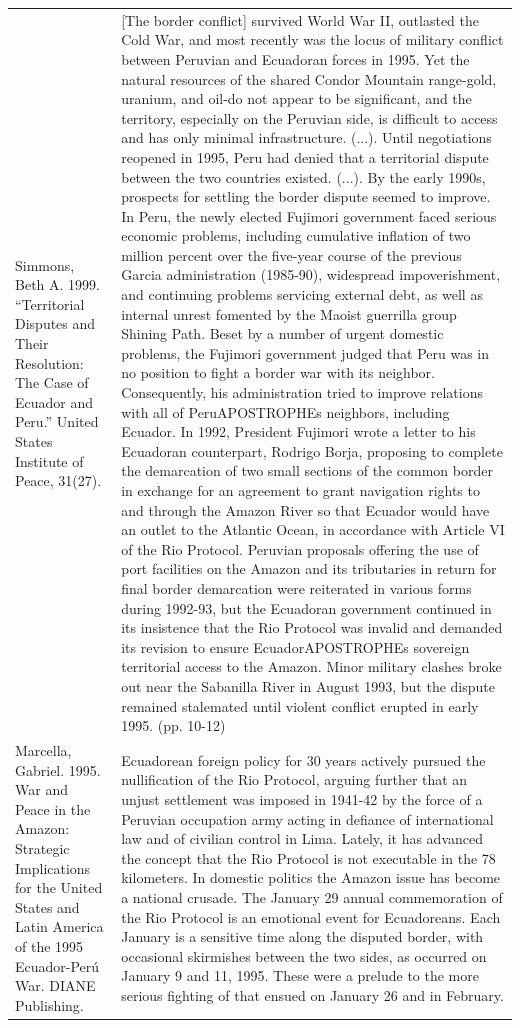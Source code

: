 {\begin{longtable}{p{}p{}}
\\
Simmons, Beth A. 1999. “Territorial Disputes and Their Resolution: The Case of Ecuador and Peru.” United States Institute of Peace, 31(27). & [The border conflict] survived World War II, outlasted the Cold War, and most recently was the locus of military conflict between Peruvian and Ecuadoran forces in 1995. Yet the natural resources of the shared Condor Mountain range-gold, uranium, and oil-do not appear to be significant, and the territory, especially on the Peruvian side, is difficult to access and has only minimal infrastructure. (...). Until negotiations reopened in 1995, Peru had denied that a territorial dispute between the two countries existed. (...). By the early 1990s, prospects for settling the border dispute seemed to improve. In Peru, the newly elected Fujimori government faced serious economic problems, including cumulative inflation of two million percent over the five-year course of the previous Garcia administration (1985-90), widespread impoverishment, and continuing problems servicing external debt, as well as internal unrest fomented by the Maoist guerrilla group Shining Path. Beset by a number of urgent domestic problems, the Fujimori government judged that Peru was in no position to fight a border war with its neighbor. Consequently, his administration tried to improve relations with all of PeruAPOSTROPHEs neighbors, including Ecuador. In 1992, President Fujimori wrote a letter to his Ecuadoran counterpart, Rodrigo Borja, proposing to complete the demarcation of two small sections of the common border in exchange for an agreement to grant navigation rights to and through the Amazon River so that Ecuador would have an outlet to the Atlantic Ocean, in accordance with Article VI of the Rio Protocol. Peruvian proposals offering the use of port facilities on the Amazon and its tributaries in return for final border demarcation were reiterated in various forms during 1992-93, but the Ecuadoran government continued in its insistence that the Rio Protocol was invalid and demanded its revision to ensure EcuadorAPOSTROPHEs sovereign territorial access to the Amazon. Minor military clashes broke out near the Sabanilla River in August 1993, but the dispute remained stalemated until violent conflict erupted in early 1995.  (pp. 10-12)
\\
Marcella, Gabriel. 1995. War and Peace in the Amazon: Strategic Implications for the United States and Latin America of the 1995 Ecuador-Perú War. DIANE Publishing. & Ecuadorean foreign policy for 30 years actively pursued the nullification of the Rio Protocol, arguing further that an unjust settlement was imposed in 1941-42 by the force of a Peruvian occupation army acting in defiance of international law and of civilian control in Lima. Lately, it has advanced the concept that the Rio Protocol is not executable in the 78 kilometers. In domestic politics the Amazon issue has become a national crusade. The January 29 annual commemoration of the Rio Protocol is an emotional event for Ecuadoreans. Each January is a sensitive time along the disputed border, with occasional skirmishes between the two sides, as occurred on January 9 and 11, 1995. These were a prelude to the more serious fighting of that ensued on January 26 and in February.

\end{longtable}}
